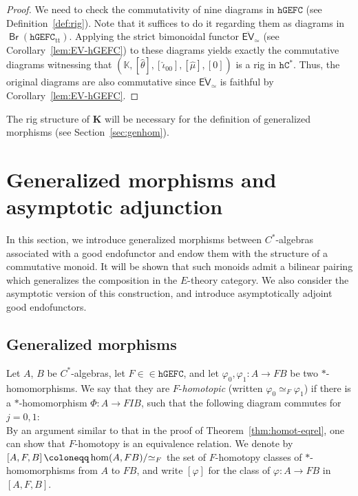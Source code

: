 \documentclass[10pt]{simplearticle}
\newcommand{\tikzinput}[1]{}
\newcommand{\hGEFC}{\mathtt{hGEFC}}
\newcommand{\hCstar}{\mathtt{hC^{*}}}
\newcommand{\mathsb}[1]{\boldsymbol{\mathsf{#1}}}
\newcommand{\Br}{\operatorname{\mathsb{Br}}}
\newcommand{\EV}{\mathsb{EV}}
\newcommand{\oK}{\mathbb{K}}
\newcommand{\fK}{\mathbf{K}}
\newcommand{\ttt}{\operatorname{tt}}
\newcommand{\modrel}[1]{/\hspace{-0.6ex}#1\hspace{0.1ex}}
\begin{document}
\begin{proof}
We need to check the commutativity of nine diagrams in $\hGEFC$ (see
Definition~\ref{def:rig}). Note that it suffices to do it regarding
them as diagrams in $\Br(\hGEFC_{\ttt})$. Applying the strict bimonoidal
functor $\overline{\EV}_{\simeq}$ (see Corollary~\ref{lem:EV-hGEFC})
to these diagrams yields exactly the commutative diagrams witnessing
that $(\oK,[\widehat{\theta}],[\widehat{\iota}_{00}],[\widehat{\mu}],[0])$
is a rig in $\hCstar$. Thus, the original diagrams are also commutative
since $\overline{\EV}_{\simeq}$ is faithful by Corollary~\ref{lem:EV-hGEFC}.
\end{proof}
The rig structure of $\fK$ will be necessary for
the definition of generalized morphisms (see Section~\ref{sec:genhom}).
\section{\label{sec:genhom}Generalized morphisms and asymptotic adjunction}

In this section, we introduce generalized morphisms between $C^{*}$-algebras
associated with a good endofunctor and endow them with the structure
of a commutative monoid. It will be shown that such monoids admit
a bilinear pairing which generalizes the composition in the $E$-theory
category. We also consider the asymptotic version of this construction,
and introduce asymptotically adjoint good endofunctors.

\subsection{Generalized morphisms}

\begin{defn}
Let $A$, $B$ be $C^{*}$-algebras, let $F\in\in\hGEFC$, and let
$\varphi_{0},\varphi_{1}\colon A\to FB$ be two $*$-homomorphisms.
We say that they are $F$-\emph{homotopic} (written $\varphi_{0}\simeq_{F}\varphi_{1}$)
if there is a $*$-homomorphism $\Phi\colon A\to FIB$, such that
the following diagram commutes for $j=0,1$:
\[
\tikzinput{d434}
\]
By an argument similar to that in the proof of Theorem~\ref{thm:homot-eqrel},
one can show that $F$-homotopy is an equivalence relation. We denote
by $\left[A,F,B\right]\coloneqq\hom(A,FB)\modrel{\simeq_{F}}$ the
set of $F$-homotopy classes of $*$-homomorphisms from $A$ to $FB$,
and write $[\varphi]$ for the class of $\varphi\colon A\to FB$ in
$[A,F,B]$.
\end{defn}
\end{document}
